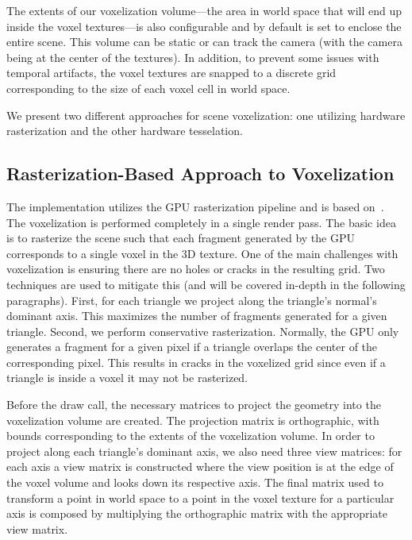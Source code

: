 The extents of our voxelization volume---the area in world space that will end up inside the voxel textures---is also configurable and by default is set to enclose the entire scene. This volume can be static or can track the camera (with the camera being at the center of the textures). In addition, to prevent some issues with temporal artifacts, the voxel textures are snapped to a discrete grid corresponding to the size of each voxel cell in world space.

We present two different approaches for scene voxelization: one utilizing hardware rasterization and the other hardware tesselation.

\subsection{Rasterization-Based Approach to Voxelization}
The implementation utilizes the GPU rasterization pipeline and is based on~\cite{crassin2012octree}. The voxelization is performed completely in a single render pass. The basic idea is to rasterize the scene such that each fragment generated by the GPU corresponds to a single voxel in the 3D texture.
One of the main challenges with voxelization is ensuring there are no holes or cracks in the resulting grid. Two techniques are used to mitigate this (and will be covered in-depth in the following paragraphs). First, for each triangle we project along the triangle's normal's dominant axis. This maximizes the number of fragments generated for a given triangle. Second, we perform conservative rasterization. Normally, the GPU only generates a fragment for a given pixel if a triangle overlaps the center of the corresponding pixel. This results in cracks in the voxelized grid since even if a triangle is inside a voxel it may not be rasterized.

Before the draw call, the necessary matrices to project the geometry into the voxelization volume are created. The projection matrix is orthographic, with bounds corresponding to the extents of the voxelization volume. In order to project along each triangle's dominant axis, we also need three view matrices: for each axis a view matrix is constructed where the view position is at the edge of the voxel volume and looks down its respective axis. The final matrix used to transform a point in world space to a point in the voxel texture for a particular axis is composed by multiplying the orthographic matrix with the appropriate view matrix.

